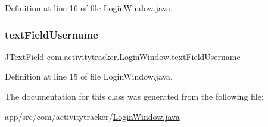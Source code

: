 Definition at line 16 of file Login\+Window.\+java.

\mbox{\label{classcom_1_1activitytracker_1_1_login_window_aba181dcec114c349a67304406bcce92a}} 
\subsubsection{\texorpdfstring{textFieldUsername}{textFieldUsername}}
{\footnotesize\ttfamily J\+Text\+Field com.\+activitytracker.\+Login\+Window.\+text\+Field\+Username\hspace{0.3cm}{\ttfamily [private]}}



Definition at line 15 of file Login\+Window.\+java.



The documentation for this class was generated from the following file\+:\begin{DoxyCompactItemize}
\item 
app/src/com/activitytracker/\mbox{\hyperlink{_login_window_8java}{Login\+Window.\+java}}\end{DoxyCompactItemize}
